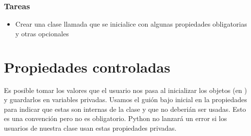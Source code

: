 \documentclass[a4paper,12pt,spanish]{sphinxmanual}
\begin{document}
\subsection{Tareas}
\label{\detokenize{class:tareas}}\begin{itemize}
\item {} 
\sphinxAtStartPar
Crear una clase llamada  que se inicialice con algunas propiedades obligatorias y otras opcionales

\end{itemize}

\sphinxstepscope


\chapter{Propiedades controladas}
\label{\detokenize{class-props:propiedades-controladas}}\label{\detokenize{class-props::doc}}
\sphinxAtStartPar
Es posible tomar los valores que el usuario nos pasa al inicializar los objetos
(en ) y guardarlos en variables privadas. Usamos el guión bajo inicial
en la propiedades para indicar que estas son internas de la clase y que no deberián
ser usadas. Esto es una convención pero no es obligatorio. Python no lanzará un error
si los usuarios de nuestra clase usan estas propiedades privadas.

%
\begin{sphinxVerbatim}[commandchars=\\\{\},numbers=left,firstnumber=1,stepnumber=1]
 
       
          
          

     
         

     
         
\end{sphinxVerbatim}
\sphinxresetverbatimhllines
\end{document}
